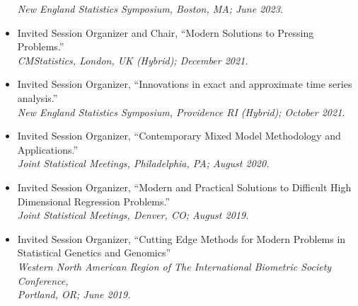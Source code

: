 \documentclass[11pt]{article}
\newcommand{\tab}{\hspace*{2em}}
\begin{document}
\begin{itemize}
	\tab \emph{New England Statistics Symposium, Boston, MA; June 2023.}  \vspace{-2mm}
	\item[] Invited Session Organizer and Chair, ``Modern Solutions to Pressing Problems.'' \hfill   \\
	\tab \emph{CMStatistics, London, UK (Hybrid); December 2021.}  \vspace{-2mm}
	\item[] Invited Session Organizer, ``Innovations in exact and approximate time series analysis.'' \hfill   \\
	\tab \emph{New England Statistics Symposium, Providence RI (Hybrid); October 2021.}  \vspace{-2mm}
	\item[] Invited Session Organizer, ``Contemporary Mixed Model Methodology and Applications.'' \hfill   \\
	\tab \emph{Joint Statistical Meetings, Philadelphia, PA; August 2020.}  \vspace{-2mm}
	\item[] Invited Session Organizer, ``Modern and Practical Solutions to Difficult High Dimensional Regression Problems.'' \hfill   \\
	\tab \emph{Joint Statistical Meetings, Denver, CO; August 2019.}  \vspace{-2mm}
	\item[] Invited Session Organizer, ``Cutting Edge Methods for Modern Problems in Statistical Genetics and Genomics'' \hfill   \\
	\tab \emph{Western North American Region of The International Biometric Society Conference,} \\
	\tab \emph{Portland, OR; June 2019.}  \vspace{-2mm}
\end{itemize}
\end{document}
